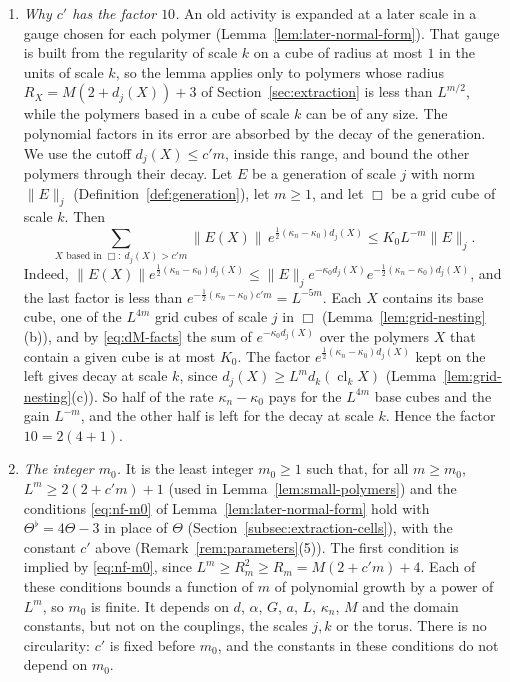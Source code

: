 \begin{remark}\label{rem:polymer-classes}
\begin{enumerate}[label=(\alph*)]
\item \emph{Why $c'$ has the factor $10$.} An old activity is expanded at a later scale in a gauge chosen for each polymer (Lemma~\ref{lem:later-normal-form}). That gauge is built from the regularity of scale $k$ on a cube of radius at most $1$ in the units of scale $k$, so the lemma applies only to polymers whose radius $R_X=M(2+d_j(X))+3$ of Section~\ref{sec:extraction} is less than $L^{m/2}$, while the polymers based in a cube of scale $k$ can be of any size. The polynomial factors in its error are absorbed by the decay of the generation. We use the cutoff $d_j(X)\le c'm$, inside this range, and bound the other polymers through their decay. Let $E$ be a generation of scale $j$ with norm $\|E\|_j$ (Definition~\ref{def:generation}), let $m\ge1$, and let $\Box$ be a grid cube of scale $k$. Then
\[
\sum_{X\text{ based in }\Box:\ d_j(X)>c'm}\|E(X)\|\,e^{\frac12(\kappa_n-\kappa_0)d_j(X)}\le K_0L^{-m}\|E\|_j .
\]
Indeed, $\|E(X)\|e^{\frac12(\kappa_n-\kappa_0)d_j(X)}\le\|E\|_je^{-\kappa_0d_j(X)}e^{-\frac12(\kappa_n-\kappa_0)d_j(X)}$, and the last factor is less than $e^{-\frac12(\kappa_n-\kappa_0)c'm}=L^{-5m}$. Each $X$ contains its base cube, one of the $L^{4m}$ grid cubes of scale $j$ in $\Box$ (Lemma~\ref{lem:grid-nesting}(b)), and by \eqref{eq:dM-facts} the sum of $e^{-\kappa_0d_j(X)}$ over the polymers $X$ that contain a given cube is at most $K_0$. The factor $e^{\frac12(\kappa_n-\kappa_0)d_j(X)}$ kept on the left gives decay at scale $k$, since $d_j(X)\ge L^md_k(\operatorname{cl}_kX)$ (Lemma~\ref{lem:grid-nesting}(c)). So half of the rate $\kappa_n-\kappa_0$ pays for the $L^{4m}$ base cubes and the gain $L^{-m}$, and the other half is left for the decay at scale $k$. Hence the factor $10=2(4+1)$.
\item \emph{The integer $m_0$.} It is the least integer $m_0\ge1$ such that, for all $m\ge m_0$, $L^m\ge2(2+c'm)+1$ (used in Lemma~\ref{lem:small-polymers}) and the conditions \eqref{eq:nf-m0} of Lemma~\ref{lem:later-normal-form} hold with $\Theta^\flat=4\Theta-3$ in place of $\Theta$ (Section~\ref{subsec:extraction-cells}), with the constant $c'$ above (Remark~\ref{rem:parameters}(5)). The first condition is implied by \eqref{eq:nf-m0}, since $L^m\ge R_m^2\ge R_m=M(2+c'm)+4$. Each of these conditions bounds a function of $m$ of polynomial growth by a power of $L^m$, so $m_0$ is finite. It depends on $d$, $\alpha$, $G$, $a$, $L$, $\kappa_n$, $M$ and the domain constants, but not on the couplings, the scales $j,k$ or the torus. There is no circularity: $c'$ is fixed before $m_0$, and the constants in these conditions do not depend on $m_0$.
\end{enumerate}
\end{remark}

